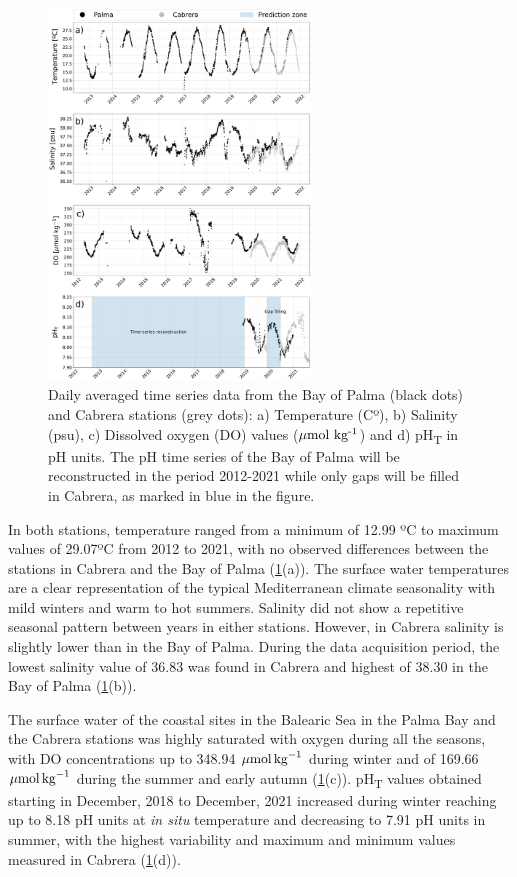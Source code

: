 \begin{figure}[H]
    \centering
    \includegraphics[width=0.62\textwidth]{Figures/Data_study.pdf}
    \caption{Daily averaged time series data from the Bay of Palma (black dots)
        and Cabrera stations (grey dots): a) Temperature (Cº), b) Salinity
        (psu), c)
        Dissolved oxygen (DO) values (${\mu\textrm{mol
                        kg}\textsuperscript{-1}}$) and
        d) pH\textsubscript{T} in pH units. The pH time series of the Bay of
        Palma will
        be reconstructed in the period 2012-2021 while only gaps will be filled
        in
        Cabrera, as marked in blue in the figure.}
    \label{fig:data}
\end{figure}

In both stations, temperature ranged from a minimum of 12.99 ºC to maximum
values of 29.07ºC from 2012 to 2021, with no observed differences between the
stations in Cabrera and the Bay of Palma (\cref{fig:data}(a)). The surface
water temperatures are a clear representation of the typical Mediterranean
climate seasonality with mild winters and warm to hot summers. Salinity did not
show a repetitive seasonal pattern between years in either stations. However,
in Cabrera salinity is slightly lower than in the Bay of Palma. During the data
acquisition period, the lowest salinity value of 36.83 was found in Cabrera and
highest of 38.30 in the Bay of Palma (\cref{fig:data}(b)).

The surface water of the coastal sites in the Balearic Sea in the Palma Bay
and the Cabrera stations was highly saturated with oxygen during all the
seasons, with DO concentrations up to  348.94 ${\mu \textrm{mol\,kg}^{-1}}$
during winter and of 169.66 ${\mu \textrm{mol\,kg}^{-1}}$ during the summer and
early autumn (\cref{fig:data}(c)). pH\textsubscript{T} values obtained starting
in December, 2018 to December, 2021 increased during winter reaching up to 8.18
pH units at \emph{in situ} temperature and decreasing to 7.91 pH units in
summer, with the highest variability and maximum and minimum values measured in
Cabrera (\cref{fig:data}(d)).

